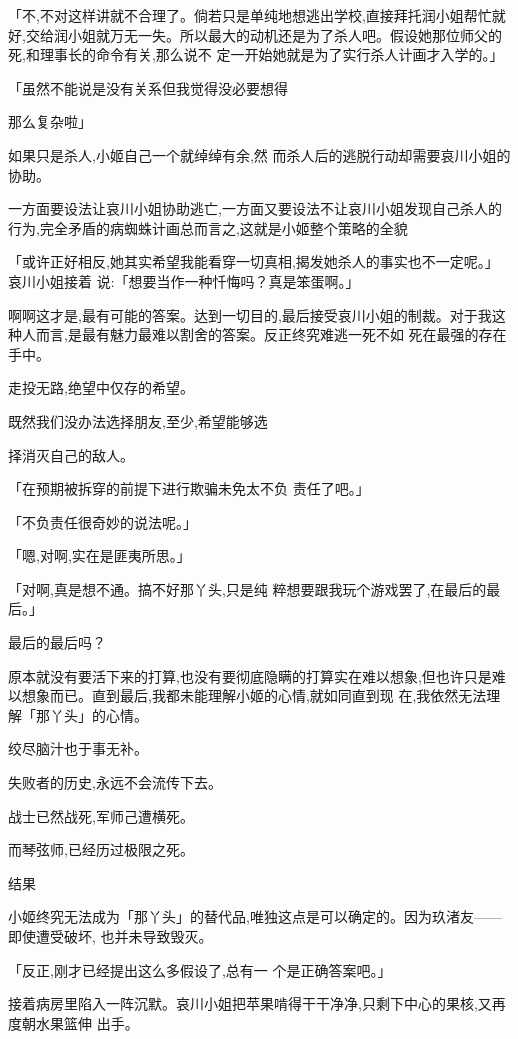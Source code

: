 \documentclass{article}
\begin{document}
「不,不对这样讲就不合理了。倘若只是单纯地想逃出学校,直接拜托润小姐帮忙就好,交给润小姐就万无一失。所以最大的动机还是为了杀人吧。假设她那位师父的死,和理事长的命令有关,那么说不
定一开始她就是为了实行杀人计画才入学的。」 

「虽然不能说是没有关系但我觉得没必要想得

\newpage
那么复杂啦」 

如果只是杀人,小姬自己一个就绰绰有余,然
而杀人后的逃脱行动却需要哀川小姐的协助。 

一方面要设法让哀川小姐协助逃亡,一方面又要设法不让哀川小姐发现自己杀人的行为,完全矛盾的病蜘蛛计画总而言之,这就是小姬整个策略的全貌

「或许正好相反,她其实希望我能看穿一切真相,揭发她杀人的事实也不一定呢。」哀川小姐接着
说:「想要当作一种忏悔吗？真是笨蛋啊。」 

啊啊这才是,最有可能的答案。达到一切目的,最后接受哀川小姐的制裁。对于我这种人而言,是最有魅力最难以割舍的答案。反正终究难逃一死不如
死在最强的存在手中。 


走投无路,绝望中仅存的希望。 

既然我们没办法选择朋友,至少,希望能够选

\newpage
择消灭自己的敌人。 

「在预期被拆穿的前提下进行欺骗未免太不负
责任了吧。」 


「不负责任很奇妙的说法呢。」 


「嗯,对啊,实在是匪夷所思。」 

「对啊,真是想不通。搞不好那丫头,只是纯
粹想要跟我玩个游戏罢了,在最后的最后。」 


最后的最后吗？ 

原本就没有要活下来的打算,也没有要彻底隐瞒的打算实在难以想象,但也许只是难以想象而已。直到最后,我都未能理解小姬的心情,就如同直到现
在,我依然无法理解「那丫头」的心情。 


绞尽脑汁也于事无补。 


\newpage

失败者的历史,永远不会流传下去。 


战士已然战死,军师己遭横死。 


而琴弦师,已经历过极限之死。 


结果 

小姬终究无法成为「那丫头」的替代品,唯独这点是可以确定的。因为玖渚友——即使遭受破坏,
也并未导致毁灭。 

「反正,刚才已经提出这么多假设了,总有一
个是正确答案吧。」 

接着病房里陷入一阵沉默。哀川小姐把苹果啃得干干净净,只剩下中心的果核,又再度朝水果篮伸
出手。 
\end{document}
